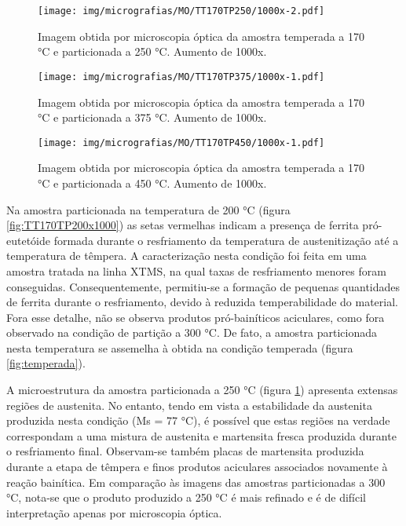 \begin{figure}
	\texttt{[image: img/micrografias/MO/TT170TP250/1000x-2.pdf]}
	\caption{Imagem obtida por microscopia óptica da amostra temperada a 170 °C e particionada a 250 °C. Aumento de 1000x.}
	\label{fig:TT170TP250x1000}
\end{figure}

\begin{figure}
	\texttt{[image: img/micrografias/MO/TT170TP375/1000x-1.pdf]}
	\caption{Imagem obtida por microscopia óptica da amostra temperada a 170 °C e particionada a 375 °C. Aumento de 1000x.}
	\label{fig:TT170TP375x1000}
\end{figure}

\begin{figure}
	\texttt{[image: img/micrografias/MO/TT170TP450/1000x-1.pdf]}
	\caption{Imagem obtida por microscopia óptica da amostra temperada a 170 °C e particionada a 450 °C. Aumento de 1000x.}
	\label{fig:TT170TP450x1000}
\end{figure}

Na amostra particionada na temperatura de 200 °C (figura \ref{fig:TT170TP200x1000}) as setas vermelhas indicam a presença de ferrita pró-eutetóide formada durante o resfriamento da temperatura de austenitização até a temperatura de têmpera. A caracterização nesta condição foi feita em uma amostra tratada na linha XTMS, na qual taxas de resfriamento menores foram conseguidas. Consequentemente, permitiu-se a formação de pequenas quantidades de ferrita durante o resfriamento, devido à reduzida temperabilidade do material. Fora esse detalhe, não se observa produtos pró-bainíticos aciculares, como fora observado na condição de partição a 300 °C. De fato, a amostra particionada nesta temperatura se assemelha à obtida na condição temperada (figura \ref{fig:temperada}).

A microestrutura da amostra particionada a 250 °C (figura \ref{fig:TT170TP250x1000}) apresenta extensas regiões de austenita. No entanto, tendo em vista a estabilidade da austenita produzida nesta condição (Ms = 77 °C), é possível que estas regiões na verdade correspondam a uma mistura de austenita e martensita fresca produzida durante o resfriamento final. Observam-se também placas de martensita produzida durante a etapa de têmpera e finos produtos aciculares associados novamente à reação bainítica. Em comparação às imagens das amostras particionadas a 300 °C, nota-se que o produto produzido a 250 °C é mais refinado e é de difícil interpretação apenas por microscopia óptica.

